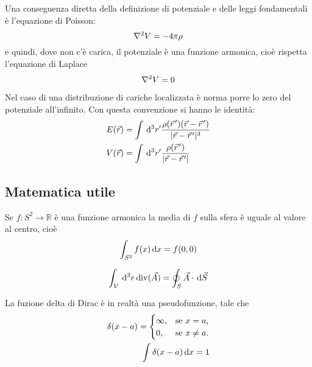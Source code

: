 \documentclass[../main.tex]{subfiles}
\begin{document}
Una conseguenza diretta della definizione di potenziale e delle leggi fondamentali è l'equazione di Poisson:
\begin{equation}\label{Poisson}
	\nabla^2 V=-4\pi \rho
\end{equation}
e quindi, dove non c'è carica, il potenziale è una funzione armonica, cioè rispetta l'equazione di Laplace
\begin{equation}\label{Laplace}
	\nabla^2 V=0
\end{equation}

Nel caso di una distribuzione di cariche localizzata è norma porre lo zero del potenziale all'infinito. 
Con questa convenzione si hanno le identità:
\begin{align}
	E(\vec r)&=\int \de^3 r' \frac{\rho(\pvec r')(\vec r-\pvec r')}{\abs{\vec{r}-\pvec r'}^3}\\
	V(\vec{r})&=\int \de^3 r' \frac{\rho(\pvec r')}{\abs{\vec{r}-\pvec r'}}\label{PotenzialeLocalizzato}
\end{align}



\subsection{Matematica utile}\label{Matematica}
\begin{theorem}
  \label{ThMedia}
  Se $f:S^2 \to \mathbb{R}$ \`e una funzione armonica la media di $f$ sulla sfera è uguale al valore al centro, cioè
  \begin{equation}
    \int_{S^2} f(x) \,\mathrm d x = f(0,0)
  \end{equation}
\end{theorem}

\begin{theorem}
  \label{ThDivergenza}
  \begin{equation}
    \int_V \,\mathrm d^3 r \operatorname{div}(\vec A) = \oint_S \vec A \cdot \,\mathrm d \vec S
  \end{equation}
\end{theorem}

\begin{definition}
La fuzione delta di Dirac è in realtà una pseudofunzione, tale che
  \begin{subequations}
    \label{DeltaDirac}
    \begin{align}
      \delta(x-a)=
      \begin{cases}
	\infty,	& \text{se $x=a$,} \\
	0, 	& \text{se $x \neq a$.}
      \end{cases}\\
      \int \delta (x-a) \,\mathrm d x =1
    \end{align}
  \end{subequations}
\end{definition}
\end{document}
